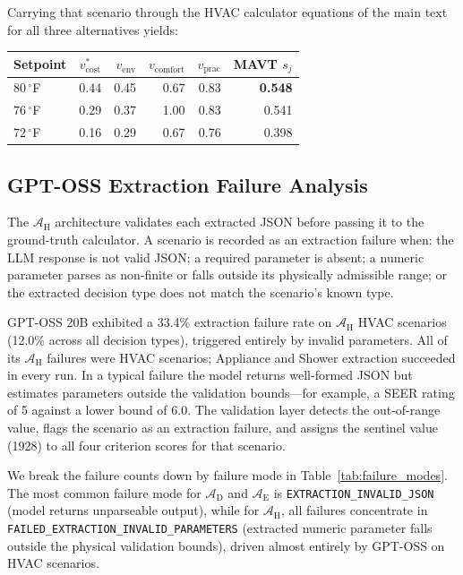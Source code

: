 \documentclass[11pt]{article}
\begin{document}
Carrying that scenario through the HVAC calculator equations of the main
text for all three alternatives yields:
\begin{center}
\begin{tabular}{@{}lrrrrr@{}}
\toprule
\textbf{Setpoint} & \textbf{$v_{\text{cost}}^{*}$} & \textbf{$v_{\text{env}}$}
  & \textbf{$v_{\text{comfort}}$} & \textbf{$v_{\text{prac}}$}
  & \textbf{MAVT $s_j$} \\
\midrule
$80\,^\circ$F & 0.44 & 0.45 & 0.67 & 0.83 & \textbf{0.548} \\
$76\,^\circ$F & 0.29 & 0.37 & 1.00 & 0.83 & 0.541 \\
$72\,^\circ$F & 0.16 & 0.29 & 0.67 & 0.76 & 0.398 \\
\bottomrule
\end{tabular}
\end{center}
\subsection{GPT-OSS Extraction Failure Analysis}
\label{app:extraction_failure_analysis}
The $\mathcal{A}_{\text{H}}$ architecture validates each extracted JSON
before passing it to the ground-truth calculator. A scenario is recorded
as an extraction failure when: the LLM response is not valid JSON; a
required parameter is absent; a numeric parameter parses as non-finite or
falls outside its physically admissible range; or the extracted decision
type does not match the scenario's known type.

GPT-OSS 20B exhibited a 33.4\% extraction failure rate on
$\mathcal{A}_{\text{H}}$ HVAC scenarios (12.0\% across all decision types),
triggered entirely by invalid parameters. All of its $\mathcal{A}_{\text{H}}$
failures were HVAC scenarios; Appliance and Shower extraction succeeded in
every run. In a typical failure the model returns well-formed JSON but
estimates parameters outside the validation bounds---for example, a SEER rating of 5 against a
lower bound of 6.0. The validation layer detects the out-of-range value,
flags the scenario as an extraction failure, and assigns the sentinel
value (1928) to all four criterion scores for that scenario.

We break the failure counts down by failure mode in Table~\ref{tab:failure_modes}. The most common failure mode for $\mathcal{A}_{\text{D}}$ and $\mathcal{A}_{\text{E}}$ is \texttt{EXTRACTION\_INVALID\_\allowbreak JSON} (model returns unparseable output), while for $\mathcal{A}_{\text{H}}$, all failures concentrate in \texttt{FAILED\_EXTRACTION\_\allowbreak INVALID\_\allowbreak PARAMETERS} (extracted numeric parameter falls outside the physical validation bounds), driven almost entirely by GPT-OSS on HVAC scenarios.
\end{document}
